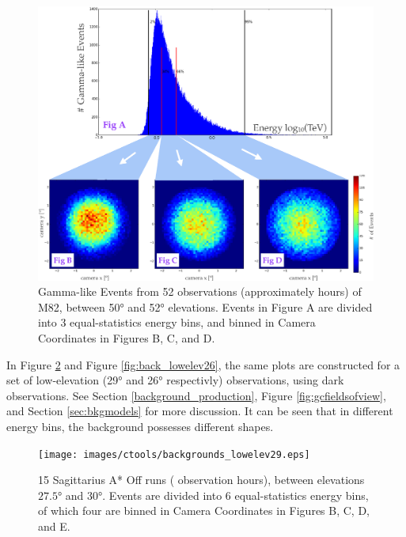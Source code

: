    \begin{figure}[ht]
      \centering
      \includegraphics[width=\textwidth]{images/ctools/backgrounds_highelev.eps}
      \caption[FITS Background at \ang{50} Elevation]{
        Gamma-like Events from 52 observations (approximately  hours) of M82, between \ang{50} and \ang{52} elevations.
        Events in Figure A are divided into 3 equal-statistics energy bins, and binned in Camera Coordinates in Figures B, C, and D.
      }
      \label{fig:back_highelev}
    \end{figure}

    In Figure \ref{fig:back_lowelev29} and Figure \ref{fig:back_lowelev26}, the same plots are constructed for a set of low-elevation (\nicetilde{}\ang{29} and \nicetilde{}\ang{26} respectivly) observations, using dark observations.
    See Section \ref{background_production}, Figure \ref{fig:gcfieldsofview}, and Section \ref{sec:bkgmodels} for more discussion.
    It can be seen that in different energy bins, the background possesses different shapes.

    \begin{figure}[ht]
      \centering
      \texttt{[image: images/ctools/backgrounds\_lowelev29.eps]}
      \caption[CTOOLS Background at \ang{29} Elevation]{
        15 Sagittarius A* Off runs ( observation hours), between elevations $ \ang{27.5} $ and $ \ang{30} $.
        Events are divided into 6 equal-statistics energy bins, of which four are binned in Camera Coordinates in Figures B, C, D, and E.
      }
      \label{fig:back_lowelev29}
    \end{figure}

